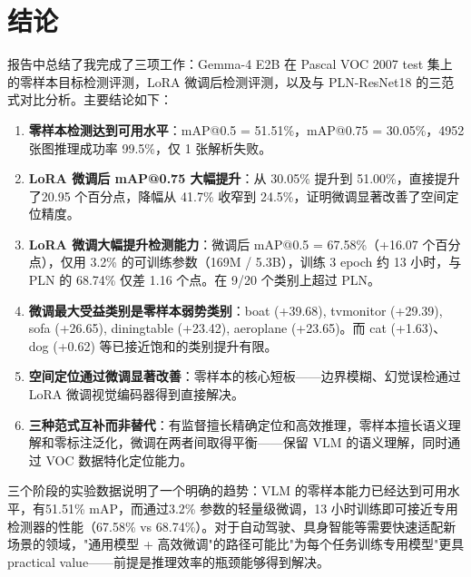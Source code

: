\documentclass[12pt, a4paper]{article}
\begin{document}
\section{结论}

报告中总结了我完成了三项工作：Gemma-4 E2B 在 Pascal VOC 2007 test 集上的零样本目标检测评测，LoRA 微调后检测评测，以及与 PLN-ResNet18 的三范式对比分析。主要结论如下：

\begin{enumerate}
    \item \textbf{零样本检测达到可用水平}：mAP@0.5 = 51.51\%，mAP@0.75 = 30.05\%，4952 张图推理成功率 99.5\%，仅 1 张解析失败。
    \item \textbf{LoRA 微调后 mAP@0.75 大幅提升}：从 30.05\% 提升到 51.00\%，直接提升了20.95 个百分点，降幅从 41.7\% 收窄到 24.5\%，证明微调显著改善了空间定位精度。
    \item \textbf{LoRA 微调大幅提升检测能力}：微调后 mAP@0.5 = 67.58\%（+16.07 个百分点），仅用 3.2\% 的可训练参数（169M / 5.3B），训练 3 epoch 约 13 小时，与 PLN 的 68.74\% 仅差 1.16 个点。在 9/20 个类别上超过 PLN。
    \item \textbf{微调最大受益类别是零样本弱势类别}：boat (+39.68), tvmonitor (+29.39), sofa (+26.65), diningtable (+23.42), aeroplane (+23.65)。而 cat (+1.63)、dog (+0.62) 等已接近饱和的类别提升有限。
    \item \textbf{空间定位通过微调显著改善}：零样本的核心短板——边界模糊、幻觉误检通过 LoRA 微调视觉编码器得到直接解决。
    \item \textbf{三种范式互补而非替代}：有监督擅长精确定位和高效推理，零样本擅长语义理解和零标注泛化，微调在两者间取得平衡——保留 VLM 的语义理解，同时通过 VOC 数据特化定位能力。
\end{enumerate}

三个阶段的实验数据说明了一个明确的趋势：VLM 的零样本能力已经达到可用水平，有51.51\% mAP，而通过3.2\% 参数的轻量级微调，13 小时训练即可接近专用检测器的性能（67.58\% vs 68.74\%）。对于自动驾驶、具身智能等需要快速适配新场景的领域，"通用模型 + 高效微调"的路径可能比"为每个任务训练专用模型"更具 practical value——前提是推理效率的瓶颈能够得到解决。
\end{document}
